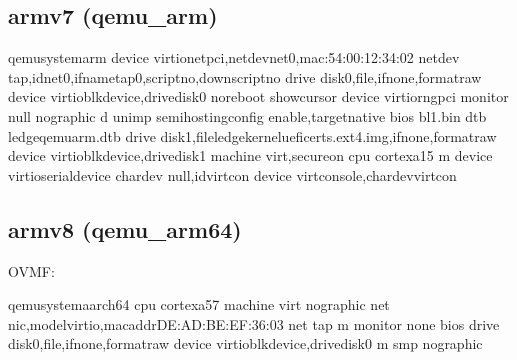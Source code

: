 \documentclass[a4paper,10pt,oneside,english]{sphinxmanual}
\begin{document}
\subsection{armv7 (qemu\_arm)}
\label{\detokenize{chapter2-oe:armv7-qemu-arm}}
\begin{sphinxVerbatim}[commandchars=\\\{\}]
qemu\PYGZhy{}system\PYGZhy{}arm  
    \PYGZhy{}device virtio\PYGZhy{}net\PYGZhy{}pci,netdevnet0,mac:54:00:12:34:02 \PYGZhy{}netdev tap,idnet0,ifnametap0,scriptno,downscriptno 
    \PYGZhy{}drive disk0,file,ifnone,formatraw \PYGZhy{}device virtio\PYGZhy{}blk\PYGZhy{}device,drivedisk0 \PYGZhy{}no\PYGZhy{}reboot \PYGZhy{}show\PYGZhy{}cursor 
    \PYGZhy{}device virtio\PYGZhy{}rng\PYGZhy{}pci \PYGZhy{}monitor null \PYGZhy{}nographic 
    \PYGZhy{}d unimp \PYGZhy{}semihosting\PYGZhy{}config enable,targetnative \PYGZhy{}bios bl1.bin \PYGZhy{}dtb ledge\PYGZhy{}qemuarm.dtb 
    \PYGZhy{}drive disk1,fileledge\PYGZhy{}kernel\PYGZhy{}uefi\PYGZhy{}certs.ext4.img,ifnone,formatraw \PYGZhy{}device virtio\PYGZhy{}blk\PYGZhy{}device,drivedisk1 
    \PYGZhy{}machine virt,secureon \PYGZhy{}cpu cortex\PYGZhy{}a15 \PYGZhy{}m   \PYGZhy{}device virtio\PYGZhy{}serial\PYGZhy{}device 
    \PYGZhy{}chardev null,idvirtcon \PYGZhy{}device virtconsole,chardevvirtcon
\end{sphinxVerbatim}


\subsection{armv8 (qemu\_arm64)}
\label{\detokenize{chapter2-oe:armv8-qemu-arm64}}
OVMF:

\begin{sphinxVerbatim}[commandchars=\\\{\}]
qemu\PYGZhy{}system\PYGZhy{}aarch64 
   \PYGZhy{}cpu cortex\PYGZhy{}a57 \PYGZhy{}machine virt \PYGZhy{}nographic \PYGZhy{}net nic,modelvirtio,macaddrDE:AD:BE:EF:36:03 \PYGZhy{}net tap \PYGZhy{}m  \PYGZhy{}monitor none 
   \PYGZhy{}bios  \PYGZhy{}drive disk0,file,ifnone,formatraw \PYGZhy{}device virtio\PYGZhy{}blk\PYGZhy{}device,drivedisk0 \PYGZhy{}m  \PYGZhy{}smp  \PYGZhy{}nographic
\end{sphinxVerbatim}
\end{document}
